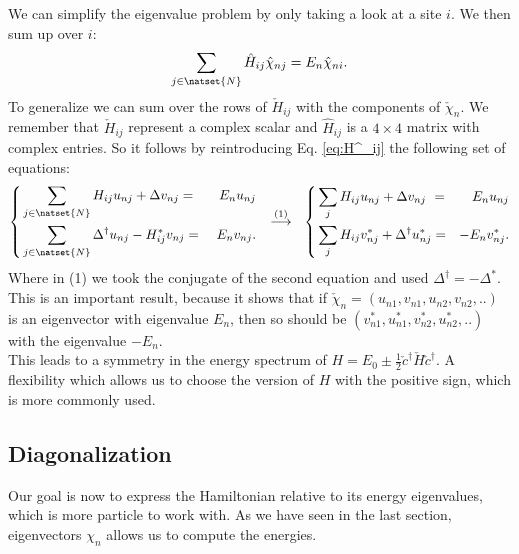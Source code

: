 \documentclass[../main.tex]{subfile}
\begin{document}
We can simplify the eigenvalue problem by only taking a look at a site $i$. We then sum up over $i$: 
\[
    \sum_{j\in\natset{N}}\hat{H}_{ij} \hat{\chi}_{nj} = E_n \hat{\chi}_{ni}.
\]
To generalize we can sum over the rows of $\check{H}_{ij}$ with the components of $\check{\chi}_n$.
We remember that $\check{H}_{ij}$ represent a complex scalar and $\hat{H}_{ij}$ is a $4\times4$ matrix with complex entries.
 So it follows by reintroducing Eq. \ref{eq:H^_ij} the following set of equations:
\begin{equation}
    \left\{
    \begin{aligned}
        &\sum_{j\in\natset{N}}H_{ij} u_{nj} + \Delta v_{nj} = &E_n u_{nj}\\
        &\sum_{j\in\natset{N}}\Delta^{\dagger} u_{nj} - H_{ij}^{\ast} v_{nj} =~& E_n v_{nj}.
    \end{aligned}
    \right.~~
    \stackrel{(1)}{\longrightarrow}~~
    \left\{
        \begin{aligned}
            &\sum_{j} H_{ij} u_{nj} + \Delta v_{nj} ~=& E_n u_{nj}\\
            &\sum_{j} H_{ij} v_{nj}^{\ast} + \Delta^{\dagger} u_{nj}^{\ast}= &-E_n v_{nj}^{\ast}.
        \end{aligned}
        \right.
\end{equation}
Where in (1) we took the conjugate of the second equation and used $\Delta^{\dagger} = -\Delta^{\ast}$.
This is an important result, because it shows that if $\check{\chi}_n = (u_{n1}, v_{n1},u_{n2}, v_{n2},.. )$ 
is an eigenvector with eigenvalue $E_n$, then  
so should be $(v_{n1}^{\ast}, u_{n1}^{\ast},v_{n2}^{\ast}, u_{n2}^{\ast},.. )$ with the eigenvalue $-E_n$.\\

This leads to a symmetry in the energy spectrum of $H = E_0 \pm \frac{1}{2}\check{c}^{\dagger}\check{H}\check{c}^{\dagger}$.
A flexibility which allows us to choose the version of $H$ with the positive sign, which is more commonly used.\\

\subsection{Diagonalization} \label{sec:Diagonalization}
Our goal is now to express the Hamiltonian relative to its energy eigenvalues, which is more particle to work with.
As we have seen in the last section, eigenvectors $\chi_n$ allows us to compute the energies.\\
\end{document}
